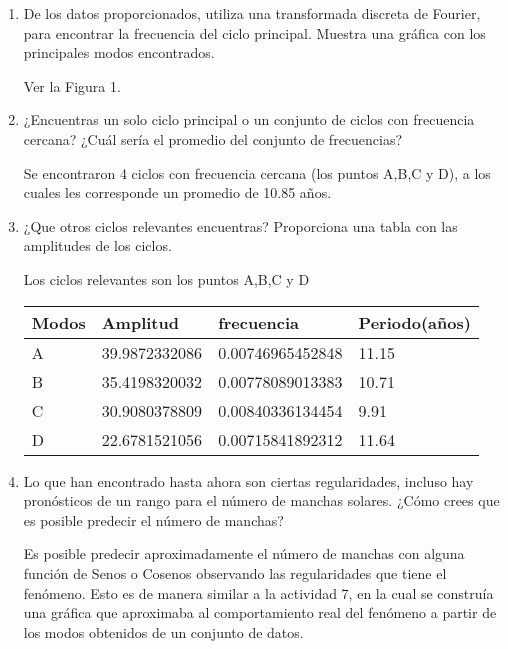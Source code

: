 \documentclass[12pt]{article}
\begin{document}
\begin{enumerate}

\item De los datos proporcionados, utiliza una transformada discreta de Fourier, para encontrar la frecuencia del ciclo principal. Muestra una gráfica con los principales modos encontrados.  

Ver la Figura 1.

\item ¿Encuentras un solo ciclo principal o un conjunto de ciclos con frecuencia cercana? ¿Cuál sería el promedio del conjunto de frecuencias?

Se encontraron 4 ciclos con frecuencia cercana (los puntos A,B,C y D), a los cuales les corresponde un promedio de 10.85 años.



\item ¿Que otros ciclos relevantes encuentras? Proporciona una tabla con las amplitudes de los ciclos. 

Los ciclos relevantes son los puntos A,B,C y D

\begin{table}[htbp]
\begin{center}
\begin{tabular}{|l|l|l|l|}

\hline 
Modos & Amplitud & frecuencia & Periodo(años) \\
\hline \hline
A & 39.9872332086 & 0.00746965452848 & 11.15\\ \hline
B & 35.4198320032 & 0.00778089013383 & 10.71 \\ \hline
C  & 30.9080378809 & 0.00840336134454 & 9.91 \\ \hline
D & 22.6781521056 &  0.00715841892312 & 11.64 \\ \hline


\end{tabular}

\end{center}
\end{table}




\item Lo que han encontrado hasta ahora son ciertas regularidades, incluso hay pronósticos de un rango para el número de manchas solares. ¿Cómo crees que es posible predecir el número de manchas?

Es posible predecir aproximadamente el número de manchas con alguna función de Senos o Cosenos observando las regularidades que tiene el fenómeno. Esto es de manera similar a la actividad 7, en la cual se construía una gráfica que aproximaba al comportamiento real del fenómeno a partir de los modos obtenidos de un conjunto de datos.

\end{enumerate}
\end{document}
